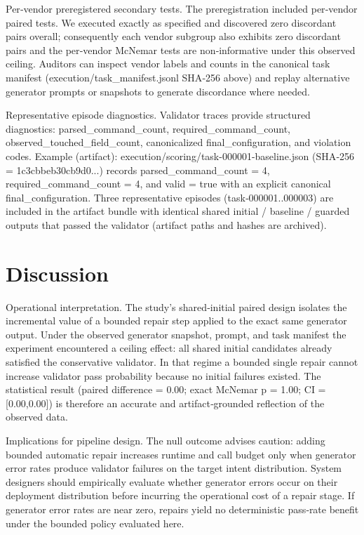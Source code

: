 \documentclass[conference]{IEEEtran}
\begin{document}
Per‑vendor preregistered secondary tests. The preregistration included per‑vendor paired tests. We executed exactly as specified and discovered zero discordant pairs overall; consequently each vendor subgroup also exhibits zero discordant pairs and the per‑vendor McNemar tests are non‑informative under this observed ceiling. Auditors can inspect vendor labels and counts in the canonical task manifest (execution/task\_manifest.jsonl SHA‑256 above) and replay alternative generator prompts or snapshots to generate discordance where needed.

Representative episode diagnostics. Validator traces provide structured diagnostics: parsed\_command\_count, required\_command\_count, observed\_touched\_field\_count, canonicalized final\_configuration, and violation codes. Example (artifact): execution/scoring/task-000001-baseline.json (SHA‑256 = 1c3cbbeb30cb9d0...) records parsed\_command\_count = 4, required\_command\_count = 4, and valid = true with an explicit canonical final\_configuration. Three representative episodes (task‑000001..000003) are included in the artifact bundle with identical shared initial / baseline / guarded outputs that passed the validator (artifact paths and hashes are archived).

\section{Discussion}
Operational interpretation. The study's shared‑initial paired design isolates the incremental value of a bounded repair step applied to the exact same generator output. Under the observed generator snapshot, prompt, and task manifest the experiment encountered a ceiling effect: all shared initial candidates already satisfied the conservative validator. In that regime a bounded single repair cannot increase validator pass probability because no initial failures existed. The statistical result (paired difference = 0.00; exact McNemar p = 1.00; CI = [0.00,0.00]) is therefore an accurate and artifact‑grounded reflection of the observed data.

Implications for pipeline design. The null outcome advises caution: adding bounded automatic repair increases runtime and call budget only when generator error rates produce validator failures on the target intent distribution. System designers should empirically evaluate whether generator errors occur on their deployment distribution before incurring the operational cost of a repair stage. If generator error rates are near zero, repairs yield no deterministic pass‑rate benefit under the bounded policy evaluated here.
\end{document}
